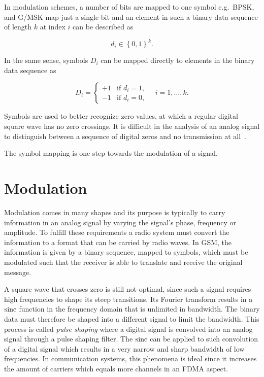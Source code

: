 In modulation schemes, a number of bits are mapped to one symbol e.g.\
\gls{BPSK}, and G/MSK map just a single bit and an element in such a
binary data sequence of length $k$ at index $i$ can be described as

\begin{equation}
  d_i \in \left\{ 0, 1\right\}^k.
\end{equation}

In the same sense, symbols $D_i$ can be mapped directly to elements in
the binary data sequence as

\begin{equation}
  D_i = \begin{cases}
    +1 & \mbox{if } d_i = 1,\\
    -1 & \mbox{if } d_i = 0,
  \end{cases} \quad i = 1, \dots, k.
\end{equation}

Symbols are used to better recognize zero values, at which a regular
digital square wave has no zero crossings. It is difficult in the
analysis of an analog signal to distinguish between a sequence of
digital zeros and no transmission at all~\cite[p. 157]{onion}.

The symbol mapping is one step towards the modulation of a signal.

\section{Modulation}
Modulation comes in many shapes and its purpose is typically to carry
information in an analog signal by varying the signal's phase,
frequency or amplitude. To fulfill these requirements a radio system
must convert the information to a format that can be carried by radio
waves. In \gls{GSM}, the information is given by a binary sequence, mapped
to symbols, which must be modulated such that the receiver is able to
translate and receive the original message.

A square wave that crosses zero is still not optimal, since such a
signal requires high frequencies to shape its steep transitions. Its
Fourier transform results in a $\operatorname{sinc}$ function in the frequency
domain that is unlimited in bandwidth. The binary data must therefore
be shaped into a different signal to limit the bandwidth. This process
is called \textit{pulse shaping} where a digital signal is convolved
into an analog signal through a pulse shaping filter. The $\operatorname{sinc}$ can
be applied to such convolution of a digital signal which results in a
very narrow and sharp bandwidth of low frequencies. In communication
systems, this phenomena is ideal since it increases the amount of
carriers which equals more channels in an \gls{FDMA} aspect.

